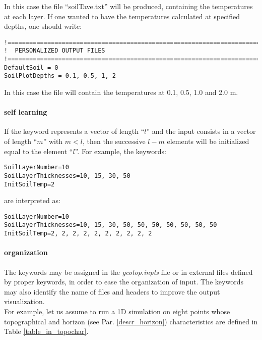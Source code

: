 \noindent In this case the file ``soilTave.txt'' will be produced, containing the temperatures at each layer. If one wanted to have the temperatures calculated at specified depths, one should write:
\footnotesize{
\begin{verbatim}
!=============================================================================
!  PERSONALIZED OUTPUT FILES
!=============================================================================
DefaultSoil = 0
SoilPlotDepths = 0.1, 0.5, 1, 2
\end{verbatim}
}

\indent In this case the file will contain the temperatures at 0.1, 0.5, 1.0 and 2.0 m.

\paragraph{self learning} If the keyword represents a vector of length ``$l$'' and the input consists in a vector of length ``$m$'' with $m<l$, then the successive $l-m$ elements will be initialized equal to the element ``$l$''.
For example, the keywords:

\footnotesize{
\begin{verbatim}
SoilLayerNumber=10
SoilLayerThicknesses=10, 15, 30, 50
InitSoilTemp=2
\end{verbatim}
}

\noindent are interpreted as:
\footnotesize{
\begin{verbatim}
SoilLayerNumber=10
SoilLayerThicknesses=10, 15, 30, 50, 50, 50, 50, 50, 50, 50
InitSoilTemp=2, 2, 2, 2, 2, 2, 2, 2, 2, 2
\end{verbatim}
}


\paragraph{organization} The keywords may be assigned in the {\it geotop.inpts} file or in external files defined by proper keywords, in order to ease the organization of input.  The keywords may also identify the name of files and headers to improve the output visualization.\\
For example, let us assume to run a 1D simulation on eight points whose topographical and horizon (see Par. \ref{descr_horizon}) characteristics are defined in Table \ref{table_in_topochar}.

